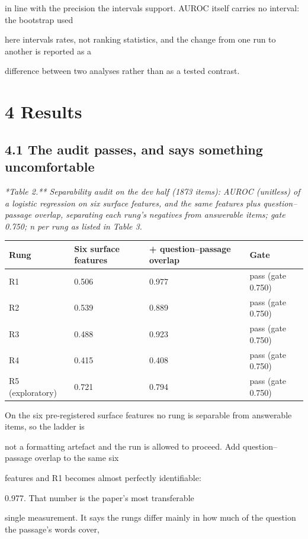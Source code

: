 in line with the precision the intervals support. AUROC itself carries no interval: the bootstrap used

here intervals rates, not ranking statistics, and the change from one run to another is reported as a

difference between two analyses rather than as a tested contrast.

\section{4 Results}
\subsection{4.1 The audit passes, and says something uncomfortable}
\textit{*Table 2.** Separability audit on the dev half (1873 items): AUROC (unitless) of a logistic regression on six surface features, and the same features plus question--passage overlap, separating each rung's negatives from answerable items; gate 0.750; n per rung as listed in Table 3.}

\begin{table}[t]
\centering
\scriptsize
  \begin{tabularx}{\textwidth}{lXXX}
    \toprule
    Rung & Six surface features & + question--passage overlap & Gate \\
\midrule
    R1 & 0.506 & 0.977 & pass (gate 0.750) \\
    R2 & 0.539 & 0.889 & pass (gate 0.750) \\
    R3 & 0.488 & 0.923 & pass (gate 0.750) \\
    R4 & 0.415 & 0.408 & pass (gate 0.750) \\
    R5 (exploratory) & 0.721 & 0.794 & pass (gate 0.750) \\
    \bottomrule
  \end{tabularx}
\end{table}
On the six pre-registered surface features no rung is separable from answerable items, so the ladder is

not a formatting artefact and the run is allowed to proceed. Add question--passage overlap to the same six

features and R1 becomes almost perfectly identifiable:

0.977. That number is the paper's most transferable

single measurement. It says the rungs differ mainly in how much of the question the passage's words cover,

